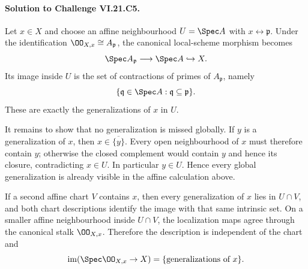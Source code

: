 \paragraph{Solution to Challenge VI.21.C5.}
\begin{solution}
Let $x\in X$ and choose an affine neighbourhood $U=\Spec A$ with
$x\leftrightarrow\mathfrak p$.  Under the identification
$\OO_{X,x}\cong A_{\mathfrak p}$, the canonical local-scheme morphism becomes
\[
\Spec A_{\mathfrak p}\longrightarrow\Spec A\hookrightarrow X.
\]
Its image inside $U$ is the set of contractions of primes of $A_{\mathfrak p}$, namely
\[
\{\mathfrak q\in\Spec A:\mathfrak q\subseteq\mathfrak p\}.
\]
These are exactly the generalizations of $x$ in $U$.

It remains to show that no generalization is missed globally.  If $y$ is a generalization of $x$,
then $x\in\overline{\{y\}}$.  Every open neighbourhood of $x$ must therefore contain $y$;
otherwise the closed complement would contain $y$ and hence its closure, contradicting
$x\in U$.  In particular $y\in U$.  Hence every global generalization is already visible in the
affine calculation above.

If a second affine chart $V$ contains $x$, then every generalization of $x$ lies in
$U\cap V$, and both chart descriptions identify the image with that same intrinsic set.  On a
smaller affine neighbourhood inside $U\cap V$, the localization maps agree through the canonical
stalk $\OO_{X,x}$.  Therefore the description is independent of the chart and
\[
\operatorname{im}(\Spec\OO_{X,x}\to X)
=\{\text{generalizations of }x\}.
\]
\end{solution}

